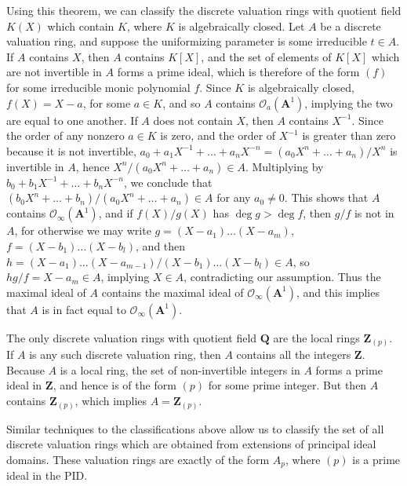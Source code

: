 \begin{example}
    Using this theorem, we can classify the discrete valuation rings with quotient field $K(X)$ which contain $K$, where $K$ is algebraically closed. Let $A$ be a discrete valuation ring, and suppose the uniformizing parameter is some irreducible $t \in A$. If $A$ contains $X$, then $A$ contains $K[X]$, and the set of elements of $K[X]$ which are not invertible in $A$ forms a prime ideal, which is therefore of the form $(f)$ for some irreducible monic polynomial $f$. Since $K$ is algebraically closed, $f(X) = X - a$, for some $a \in K$, and so $A$ contains $\mathcal{O}_a(\mathbf{A}^1)$, implying the two are equal to one another. If $A$ does not contain $X$, then $A$ contains $X^{-1}$. Since the order of any nonzero $a \in K$ is zero, and the order of $X^{-1}$ is greater than zero because it is not invertible, $a_0 + a_1X^{-1} + \dots + a_nX^{-n} = (a_0X^n + \dots + a_n)/X^n$ is invertible in $A$, hence $X^n/(a_0X^n + \dots + a_n) \in A$. Multiplying by $b_0 + b_1X^{-1} + \dots + b_nX^{-n}$, we conclude that $(b_0X^n + \dots + b_n)/(a_0X^n + \dots + a_n) \in A$ for any $a_0 \neq 0$. This shows that $A$ contains $\mathcal{O}_\infty(\mathbf{A}^1)$, and if $f(X)/g(X)$ has $\deg g > \deg f$, then $g/f$ is not in $A$, for otherwise we may write $g = (X-a_1) \dots (X-a_m)$, $f = (X-b_1) \dots (X - b_l)$, and then $h = (X-a_1) \dots (X-a_{m-1})/(X-b_1) \dots (X-b_l) \in A$, so $hg/f = X - a_m \in A$, implying $X \in A$, contradicting our assumption. Thus the maximal ideal of $A$ contains the maximal ideal of $\mathcal{O}_\infty(\mathbf{A}^1)$, and this implies that $A$ is in fact equal to $\mathcal{O}_\infty(\mathbf{A}^1)$.
\end{example}

\begin{example}
    The only discrete valuation rings with quotient field $\mathbf{Q}$ are the local rings $\mathbf{Z}_{(p)}$. If $A$ is any such discrete valuation ring, then $A$ contains all the integers $\mathbf{Z}$. Because $A$ is a local ring, the set of non-invertible integers in $A$ forms a prime ideal in $\mathbf{Z}$, and hence is of the form $(p)$ for some prime integer. But then $A$ contains $\mathbf{Z}_{(p)}$, which implies $A = \mathbf{Z}_{(p)}$.
\end{example}

Similar techniques to the classifications above allow us to classify the set of all discrete valuation rings which are obtained from extensions of principal ideal domains. These valuation rings are exactly of the form $A_p$, where $(p)$ is a prime ideal in the PID.

